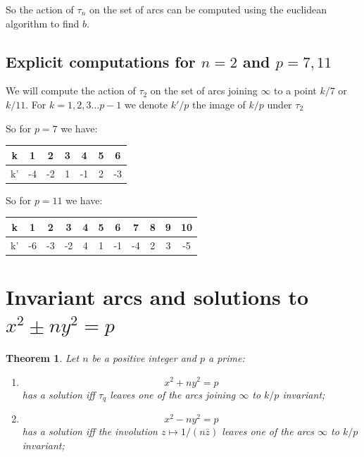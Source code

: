 \documentclass[12pt,a4paper]{amsart}
\newtheorem{thm}{Theorem}[section]
\begin{document}
So the action of $\tau_n$ on the set of arcs can be computed using the euclidean algorithm to find $b$.


\subsection{Explicit computations for $n=2$ and  $p = 7,11$}

We will compute the action of $\tau_2$ on the set of arcs joining $\infty$ to a point $k/7$ or $k/11$.
For $k = 1,2,3 \ldots p-1$ we denote $k'/p$   the image  of $k/p$ under $\tau_2$

So for $p=7$  we have:
\begin{center}
\begin{tabular}{|c|c|c|c|c|c|c|}
	\hline
	k& 1 & 2 & 3 & 4 & 5 & 6 \\ 
\hline
	k'&-4 & -2 & 1 & -1 & 2 & -3
\\  \hline
\end{tabular}

\end{center}


So for $p=11$  we have:
\begin{center}
\begin{tabular}{|c|c|c|c|c|c|c|c|c|c|c|}
\hline
k& 1 & 2 & 3 & 4 & 5 & 6 & 7 & 8 & 9 & 10 \\ 
\hline
k'& -6 & -3 & -2 & 4 & 1 & -1 & -4 & 2 & 3 & -5
\\  \hline
\end{tabular}
\end{center}


\section{Invariant arcs and solutions to $x^2  \pm n y^2 = p$}\label{fixed points}

\begin{thm}\label{fixed points theorem}
Let $n$ be a positive integer and $p$ a prime:
\begin{enumerate}
	\item 
$$ x^2 + n y^2 =p $$
has a solution iff $\tau_q$ 
leaves one of the arcs joining $\infty$ to $k/p$ invariant;

	\item $$ x^2 - n y^2 =p $$
has a solution iff the involution $z \mapsto 1/(n \bar{z})$ 
leaves one of the arcs $\infty$ to $k/p$ invariant;
\end{enumerate}


\end{thm}
\end{document}

